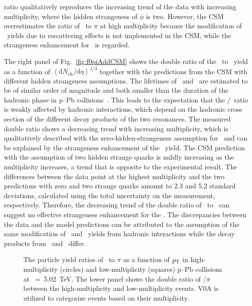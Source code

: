 ratio qualitatively reproduces the increasing trend of the data with increasing multiplicity, where the hidden strangeness of $\phi$ is two. However, the CSM overestimates the ratio of \kstar~to $\pi$ at high multiplicity because the modification of \kstar~yields due to rescattering effects is not implemented in the CSM, while the strangeness enhancement for \kstar~is regarded.

The right panel of Fig.~\ref{fig:f0piAddCSM} shows the double ratio of the \fzero~to \kstar~yield as a function of $\left\langle \mathrm{d}N_{\mathrm{ch}}/\mathrm{d}\eta \right\rangle^{1/3}$ together with the predictions from the CSM with different hidden strangeness assumptions. The lifetimes of \fzero~and \kstar~are estimated to be of similar order of magnitude and both smaller than the duration of the hadronic phase in p--Pb collisions~\cite{ParticleDataGroup:2022pth}. This leads to the expectation that the \fzero/\kstar~ratio is weakly affected by hadronic interactions, which depend on the hadronic cross section of the different decay products of the two resonances. The measured double ratio shows a decreasing trend with increasing multiplicity, which is qualitatively described with the zero-hidden-strangeness assumption for \fzero~and can be explained by the strangeness enhancement of the \kstar~yield. The CSM prediction with the assumption of two hidden strange quarks is mildly increasing as the multiplicity increases, a trend that is opposite to the experimental result. The differences between the data point at the highest multiplicity and the two predictions with zero and two strange quarks amount to 2.3 and 5.2 standard deviations, calculated using the total uncertainty on the measurement, respectively. Therefore, the decreasing trend of the double ratio of \fzero~to \kstar~can suggest no effective strangeness enhancement for the \fzero. The discrepancies between the data and the model predictions can be attributed to the assumption of the same modification of \fzero~and \kstar~yields from hadronic interactions while the decay products from \fzero~and \kstar~differ.

\begin{figure}[!hbt]
	\centering
	\caption{ The particle yield ratios of \fzero~to $\pi$ as a function of $p_{\rm{T}}$ in high-multiplicity (circles) and low-multiplicity (squares) p--Pb collisions at \snn~=~5.02~TeV. The lower panel shows the double ratio of \fzero/$\pi$ between the high-multiplicity and low-multiplicity events. V0A is utilized to categorize events based on their multiplicity.}
	\label{fig:f0piPt}
\end{figure}

